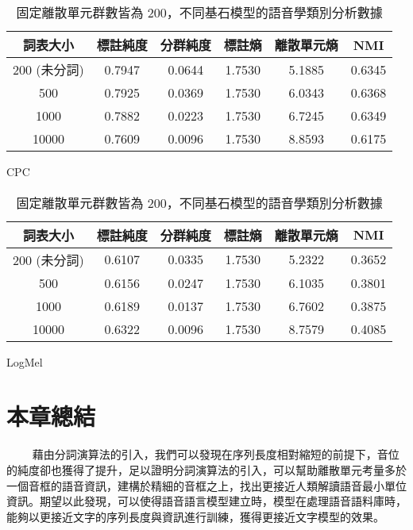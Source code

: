 \begin{table}[!htbp]
            \begin{subtable}[t]{\textwidth}
                \centering
                \begin{tabular}{|c|c|c|c|c|c|} \hline 
                        詞表大小  & 標註純度 & 分群純度 & 標註熵 & 離散單元熵 &     NMI  \\ \hline 
 200 (未分詞)&         0.7947 &   0.0644 &         1.7530 &     5.1885 &  0.6345 \\ \hline 
                            500 &  0.7925 &    0.0369 &   1.7530   & 6.0343 &    0.6368 \\ \hline %
                           1000 &  0.7882 &    0.0223 &   1.7530   & 6.7245 &    0.6349 \\ \hline %
                          10000 &  0.7609 &    0.0096 &   1.7530   & 8.8593 &    0.6175 \\ \hline %
                \end{tabular}
\caption{CPC}
                \label{tab:ch4-pcls-model-cpc}
            \end{subtable}        

            \jefftablesep        

            \begin{subtable}[t]{\textwidth}
                \centering
                \begin{tabular}{|c|c|c|c|c|c|} \hline 
                詞表大小 & 標註純度 & 分群純度 & 標註熵 & 離散單元熵 &     NMI \\ \hline 
  200 (未分詞)&         0.6107 &   0.0335 &         1.7530 &     5.2322 &  0.3652 \\ \hline 
                            500 &  0.6156 &    0.0247 &   1.7530   & 6.1035 &    0.3801 \\ \hline %
                           1000 &  0.6189 &    0.0137 &   1.7530   & 6.7602 &    0.3875 \\ \hline %
                          10000 &  0.6322 &    0.0096 &   1.7530   & 8.7579 &    0.4085 \\ \hline %
                \end{tabular}
\caption{LogMel}
                \label{tab:ch4-pcls-model-logmel}
            \end{subtable}        

\caption{固定離散單元群數皆為 200，不同基石模型的語音學類別分析數據}
            \label{tab:ch4-models-pcls}
        \end{table}
        

\section{本章總結}
　　
藉由分詞演算法的引入，我們可以發現在序列長度相對縮短的前提下，音位的純度卻也獲得了提升，足以證明分詞演算法的引入，可以幫助離散單元考量多於一個音框的語音資訊，建構於精細的音框之上，找出更接近人類解讀語音最小單位資訊。期望以此發現，可以使得語音語言模型建立時，模型在處理語音語料庫時，能夠以更接近文字的序列長度與資訊進行訓練，獲得更接近文字模型的效果。
